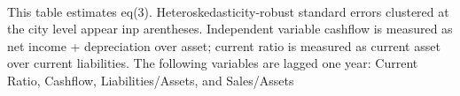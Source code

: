 \documentclass[preview]{standalone}
\begin{document}
\begin{table}[!htbp]
\begin{tablenotes} 
 \small 
 \item \\ 
This table estimates eq(3). Heteroskedasticity-robust standard errors clustered at the city level appear inp arentheses.  Independent variable cashflow is measured as net income + depreciation over asset; current ratio is measured as current asset over current liabilities. The following variables are lagged one year: Current Ratio, Cashflow, Liabilities/Assets, and Sales/Assets 
\end{tablenotes}
\end{table}
\end{document}
